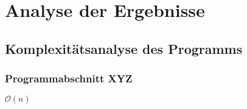 
\chapter{Analyse der Ergebnisse}

\section{Komplexitätsanalyse des Programms}

\subsection{Programmabschnitt XYZ}

$\mathcal{O}(n)$
